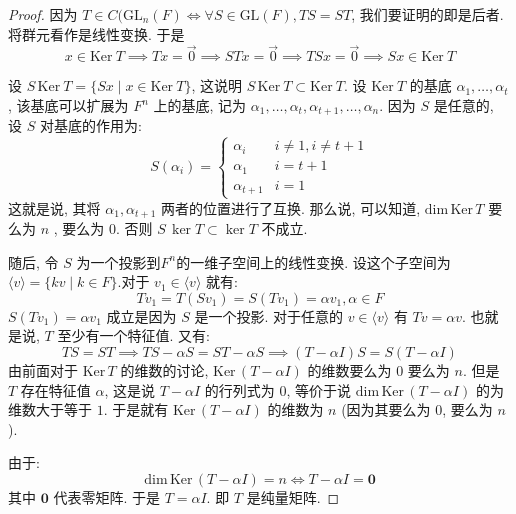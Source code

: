 \documentclass[12pt]{ctexart}
\theoremstyle{definition}
\theoremstyle{plain}
\theoremstyle{remark}
\begin{document}
\begin{proof}
因为 \(T \in C(\text{GL} _{n} (F) \iff \forall S \in \text{GL} (F) , TS = ST\), 我们要证明的即是后者.  将群元看作是线性变换. 于是
\[x \in \text{Ker}\ T \implies Tx = \vec{0} \implies ST x = \vec 0 \implies TS x = \vec 0 \implies Sx \in \text{Ker}\ T\]

设 \(S\, \text{Ker}\ T = \{ Sx \mid x \in \text{Ker} \ T \}\), 这说明 \(S\, \text{Ker}\ T \subset \text{Ker}\ T\). 设 \(\text{Ker}\ T\) 的基底 \(\alpha_{1} , \dots ,\alpha_{t}\), 该基底可以扩展为 \(F^{n}\) 上的基底, 记为 \(\alpha _{1} , \dots ,\alpha_{t},\alpha_{t + 1} , \dots ,\alpha _{n}\). 因为 \(S\) 是任意的, 设 \(S\) 对基底的作用为: 
\[
S(\alpha _{i}) = 
\begin{cases}
	\alpha_{i} & i \ne 1 , i \ne t + 1\\
	\alpha_{1} & i = t + 1 \\
	\alpha_{t + 1} & i = 1
\end{cases}
\]
这就是说, 其将 \(\alpha_{1},\alpha_{t+1}\) 两者的位置进行了互换. 那么说, 可以知道, \( \text{dim}\, \text{Ker}\,T\)  要么为 \(n\) , 要么为 \(0\). 否则 \(S\, \ker T \subset \ker T\) 不成立. 

随后, 令 \(S\) 为一个投影到\(F^{n}\)的一维子空间上的线性变换. 设这个子空间为 \(\langle v \rangle = \{ k v \mid  k\in F\}\).对于 \(v_1 \in \langle v \rangle\) 就有:
\[
Tv_1 = T(Sv_{1} ) = S (Tv_1) =\alpha v_1 ,\alpha \in F
\]
\(S (Tv_{1}) =\alpha v_1\) 成立是因为 \(S\) 是一个投影. 对于任意的 \(v  \in \langle v \rangle\) 有 \( T v  =\alpha v\). 也就是说,
\(T\) 至少有一个特征值. 又有: 
\[
T S  = ST \implies T S  -\alpha S = ST -\alpha S \implies (T -\alpha I ) S  = S ( T -\alpha I ) 
\]
由前面对于 \(\text{Ker}\,T\) 的维数的讨论, \(\text{Ker}\, (T -\alpha I)\) 的维数要么为 \(0\) 要么为 \(n\). 
但是 \(T\) 存在特征值 \(\alpha\), 这是说 \(T -\alpha I\) 的行列式为 \(0\), 等价于说 \(\text{dim}\, \text{Ker}\,(T-\alpha I)\) 的为维数大于等于 \(1\). 于是就有 \(\text{Ker}\, (T -\alpha I)\) 的维数为 \(n\) (因为其要么为 \(0\), 要么为 \(n\)). 

\noindent 由于:
\[
	\text{dim}\, \text{Ker}\, (T  -\alpha I) = n \iff T -\alpha I = \mathbf 0
\]
其中 \(\mathbf 0\) 代表零矩阵. 于是 \(T =\alpha I\). 即 \(T\) 是纯量矩阵. 
\end{proof}
\end{document}
